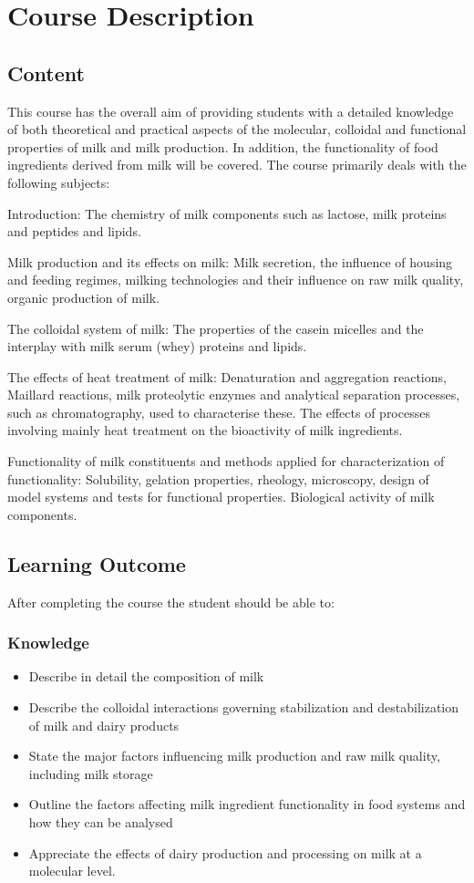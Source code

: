 \chapter{Course Description}
\section{Content}
This course has the overall aim of providing students with a detailed knowledge of both theoretical and practical aspects of the molecular, colloidal and functional properties of milk and milk production. In addition, the functionality of food ingredients derived from milk will be covered. The course primarily deals with the following subjects:

Introduction: The chemistry of milk components such as lactose, milk proteins and peptides and lipids.

Milk production and its effects on milk: Milk secretion, the influence of housing and feeding regimes, milking technologies and their influence on raw milk quality, organic production of milk.

The colloidal system of milk: The properties of the casein micelles and the interplay with milk serum (whey) proteins and lipids.

The effects of heat treatment of milk: Denaturation and aggregation reactions, Maillard reactions, milk proteolytic enzymes and analytical separation processes, such as chromatography, used to characterise these. The effects of processes involving mainly heat treatment on the bioactivity of milk ingredients.

Functionality of milk constituents and methods applied for characterization of functionality: Solubility, gelation properties, rheology, microscopy, design of model systems and tests for functional properties. Biological activity of milk components.

\section{Learning Outcome}
After completing the course the student should be able to:

\subsection{Knowledge}
\begin{highlight}
    \begin{itemize}
        \item Describe in detail the composition of milk
        \item Describe the colloidal interactions governing stabilization and destabilization of milk and dairy products
        \item State the major factors influencing milk production and raw milk quality, including milk storage
        \item Outline the factors affecting milk ingredient functionality in food systems and how they can be analysed
        \item Appreciate the effects of dairy production and processing on milk at a molecular level.
    \end{itemize}
\end{highlight}

